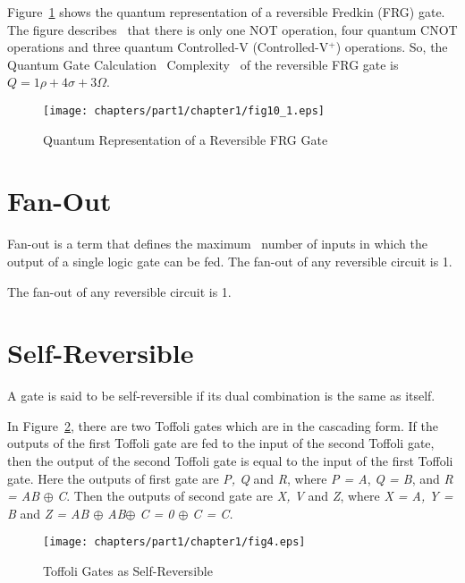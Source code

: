\begin{example}\textnormal{
Figure~\ref{fig:p1_c1_fig10_1} shows the quantum representation of a reversible Fredkin (FRG) gate. The figure describes~ that there is only one NOT operation, four quantum CNOT operations and three quantum Controlled-V (Controlled-V$^+$) operations. So, the Quantum Gate Calculation~ Complexity~ of the reversible FRG gate is $Q =1\rho +4\sigma + 3\Omega$.}
\end{example}


\begin{figure}[H]
\centering
\texttt{[image: chapters/part1/chapter1/fig10\_1.eps]}
\caption{Quantum Representation of a Reversible FRG Gate}
\label{fig:p1_c1_fig10_1}
\end{figure}



\section{Fan-Out}
Fan-out is a term that defines the maximum~ number of inputs in which the output of a single logic gate can be fed. The fan-out of any reversible circuit is 1.
\begin{example}\textnormal{
The fan-out of any reversible circuit is 1.}
\end{example}


\section{Self-Reversible}
A gate is said to be self-reversible if its dual combination is the same as itself.

\begin{example}\textnormal{
In Figure~\ref{fig:p1_c1_fig4}, there are two Toffoli gates which are in the cascading form. If the outputs of the first Toffoli gate are fed to the input of the second Toffoli gate, then the output of the second Toffoli gate is equal to the input of the first Toffoli gate.
Here the outputs of first gate are \textit{P, Q} and \textit{R}, where \textit{P = A}, \textit{Q = B}, and \textit{R = AB} $\oplus$ \textit{C}. Then the outputs of second gate are \textit{X, V} and \textit{Z}, where \textit{X = A, Y = B} and \textit{Z = AB $\oplus$ AB$\oplus$ C = 0 $\oplus$ C = C.}}
\end{example}



\begin{figure}[h]
\centering
\texttt{[image: chapters/part1/chapter1/fig4.eps]}
\caption{Toffoli Gates as Self-Reversible}
\label{fig:p1_c1_fig4}
\end{figure}

